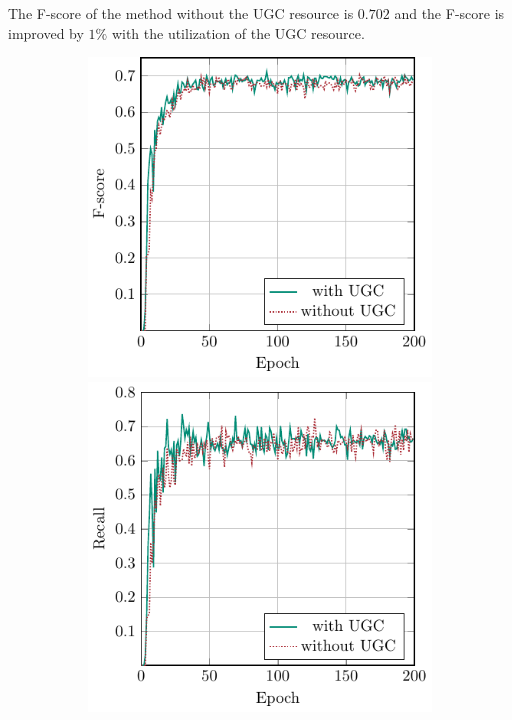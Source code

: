 \documentclass[conference]{IEEEtran}
\begin{document}
The F-score of the method without the UGC resource is $0.702$ and the F-score is improved by $1\%$ with the utilization of the UGC resource.


\begin{figure}[htb]
    \centering
    \begin{subfigure}[b]{\textwidth}
    \centering
        \includegraphics[scale=0.7]{figures/ugc-exp-f}%
        \includegraphics[scale=0.7]{figures/ugc-exp-r}

\end{subfigure}
\end{figure}
\end{document}
